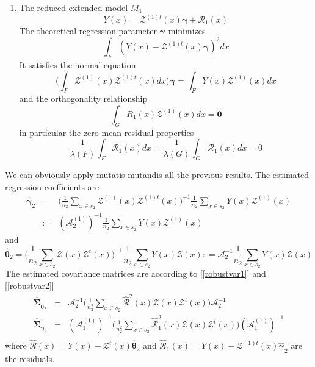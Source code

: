 \documentclass[a4paper,12pt,leqno, titlepage]{article}
\begin{document}
{\begin{enumerate}
 \item
 The reduced extended model $M_1$
 $$ Y(x)=\pmb{\mathcal{Z}}^{(1)t}(x)\pmb{\gamma} + \mathcal{R}_1(x)$$
 The theoretical regression parameter $\pmb{\gamma}$ minimizes
 $$\int_F (Y(x)-\pmb{\mathcal{Z}}^{(1)t}(x)\pmb{\gamma})^2dx$$
 It satisfies the normal equation
 $$\big(\int_F \pmb{\mathcal{Z}}^{(1)}(x)\pmb{\mathcal{Z}}^{(1)t}(x)dx\big)\pmb{\gamma}
 =\int_F Y(x)\pmb{\mathcal{Z}}^{(1)}(x)dx$$
 and the orthogonality relationship
 $$\int_G R_1(x)\pmb{\mathcal{Z}}^{(1)}(x)dx=\pmb{0}$$
 \noindent in particular the zero mean residual properties
 $$\frac{1}{\lambda(F)}\int_F \mathcal{R}_1(x)dx=\frac{1}{\lambda(G)}\int_G \mathcal{R}_1(x)dx=0$$
\end{enumerate}
We can obviously apply mutatis mutandis all the previous results. The estimated regression coefficients are
\begin{eqnarray}\label{extcoeff1}
\hat{\pmb{\gamma}}_2 &=& \Big(\frac{1}{n_2}\sum_{x\in{s}_2}\pmb{\mathcal{Z}}^{(1)}(x)\pmb{\mathcal{Z}}^{(1)t}(x)
\Big)^{-1}\frac{1}{n_2}\sum_{x\in{s}_2}Y(x)\pmb{\mathcal{Z}}^{(1)}(x)\nonumber\\
&:=&(\pmb{\mathcal{A}}^{(1)}_2)^{-1}
\frac{1}{n_2}\sum_{x\in{s}_2}Y(x)\pmb{\mathcal{Z}}^{(1)}(x)
\end{eqnarray}
and
\begin{equation}\label{extcoeff2}
\hat{\pmb{\theta}}_{2}=\Big(\frac{1}{n_2}\sum_{x\in{s}_2}\pmb{\mathcal{Z}}(x)\pmb{\mathcal{Z}}^t(x)
\Big)^{-1}\frac{1}{n_2}\sum_{x\in{s}_2}Y(x)\pmb{\mathcal{Z}}(x):
=\pmb{\mathcal{A}}^{-1}_2\frac{1}{n_2}\sum_{x\in{s}_2}Y(x)\pmb{\mathcal{Z}}(x)
\end{equation}
The estimated covariance matrices are according to [{\ref{robustvar1}] and [\ref{robustvar2}]
\begin{eqnarray}\label{robustvar3}
\hat{\pmb{\Sigma}}_{\hat{\pmb{\theta}}_2}&=&\pmb{\mathcal{A}}_2^{-1}
\Big(\frac{1}{n_2^2}\sum_{x\in{s_2}}\hat{\mathcal{R}}^2(x)\pmb{\mathcal{Z}}(x)
\pmb{\mathcal{Z}}^t(x)\Big)\pmb{\mathcal{A}}_2^{-1} \nonumber \\
\hat{\pmb{\Sigma}}_{\hat{\pmb{\gamma}}_2}&=&(\pmb{\mathcal{A}}^{(1)}_1)^{-1}
\Big(\frac{1}{n_2^2}\sum_{x\in{s_2}}\hat{\mathcal{R}}_1^2(x)\pmb{\mathcal{Z}}(x)
\pmb{\mathcal{Z}}^t(x)\Big)(\pmb{\mathcal{A}}^{(1)}_1)^{-1} \nonumber \\
\end{eqnarray}
\noindent
where $\hat{\mathcal{R}}(x)=Y(x)-\pmb{\mathcal{Z}}^t(x)\hat{\pmb{\theta}}_2$ and
$\hat{\mathcal{R}}_1(x)=Y(x)-\pmb{\mathcal{Z}}^{(1)t}(x)\hat{\pmb{\gamma}}_2$ are the residuals. \\

}}
\end{document}
